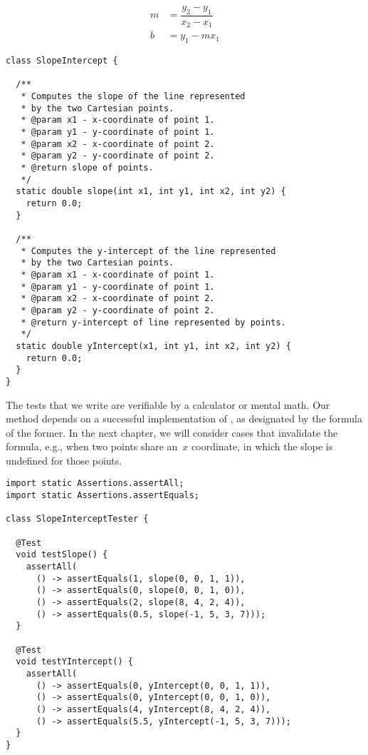 \begin{align*}
m &= \dfrac{y_2-y_1}{x_2-x_1}\\
b &= y_1 - mx_1
\end{align*}

\begin{lstlisting}[language=MyJava]
class SlopeIntercept {

  /**
   * Computes the slope of the line represented 
   * by the two Cartesian points.
   * @param x1 - x-coordinate of point 1.
   * @param y1 - y-coordinate of point 1.
   * @param x2 - x-coordinate of point 2.
   * @param y2 - y-coordinate of point 2.
   * @return slope of points.
   */
  static double slope(int x1, int y1, int x2, int y2) {
    return 0.0;
  }

  /**
   * Computes the y-intercept of the line represented 
   * by the two Cartesian points.
   * @param x1 - x-coordinate of point 1.
   * @param y1 - y-coordinate of point 1.
   * @param x2 - x-coordinate of point 2.
   * @param y2 - y-coordinate of point 2.
   * @return y-intercept of line represented by points.
   */
  static double yIntercept(x1, int y1, int x2, int y2) {
    return 0.0;
  }
}
\end{lstlisting}

The tests that we write are verifiable by a calculator or mental math. 
Our  method depends on a successful implementation of , as designated by the formula of the former. 
In the next chapter, we will consider cases that invalidate the formula, e.g., when two points share an~$x$ coordinate, in which the slope is undefined for those points.

\begin{lstlisting}[language=MyJava]
import static Assertions.assertAll;
import static Assertions.assertEquals;

class SlopeInterceptTester {
  
  @Test
  void testSlope() {
    assertAll(
      () -> assertEquals(1, slope(0, 0, 1, 1)),
      () -> assertEquals(0, slope(0, 0, 1, 0)),
      () -> assertEquals(2, slope(8, 4, 2, 4)),
      () -> assertEquals(0.5, slope(-1, 5, 3, 7)));
  }

  @Test
  void testYIntercept() {
    assertAll(
      () -> assertEquals(0, yIntercept(0, 0, 1, 1)),
      () -> assertEquals(0, yIntercept(0, 0, 1, 0)),
      () -> assertEquals(4, yIntercept(8, 4, 2, 4)),
      () -> assertEquals(5.5, yIntercept(-1, 5, 3, 7)));
  }
}
\end{lstlisting}

